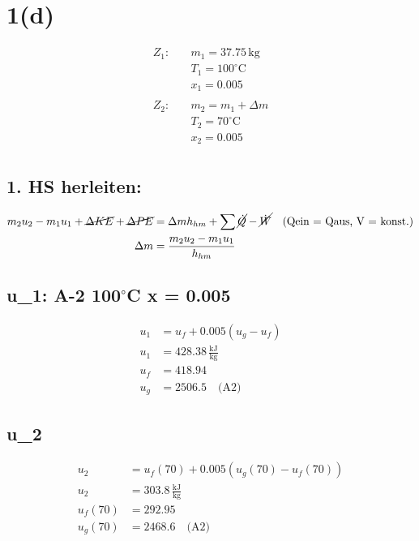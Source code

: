 \section*{1(d)}

\begin{align*}
Z_1: & \quad m_1 = 37.75 \, \text{kg} \\
     & \quad T_1 = 100^\circ \text{C} \\
     & \quad x_1 = 0.005 \\
\\
Z_2: & \quad m_2 = m_1 + \Delta m \\
     & \quad T_2 = 70^\circ \text{C} \\
     & \quad x_2 = 0.005 \\
\end{align*}

\subsection*{1. HS herleiten:}

\begin{align*}
m_2 u_2 - m_1 u_1 + \cancel{\Delta KE} + \cancel{\Delta PE} &= \Delta m h_{hm} + \sum \cancel{\dot{Q}} - \cancel{\dot{W}} \quad \text{(Qein = Qaus, V = konst.)} \\
\Delta m &= \frac{m_2 u_2 - m_1 u_1}{h_{hm}}
\end{align*}

\subsection*{u_1: A-2 100$^\circ$C x = 0.005}

\begin{align*}
u_1 &= u_f + 0.005 \left( u_g - u_f \right) \\
u_1 &= 428.38 \, \frac{\text{kJ}}{\text{kg}} \\
u_f &= 418.94 \\
u_g &= 2506.5 \quad \text{(A2)}
\end{align*}

\subsection*{u_2}

\begin{align*}
u_2 &= u_f (70) + 0.005 \left( u_g (70) - u_f (70) \right) \\
u_2 &= 303.8 \, \frac{\text{kJ}}{\text{kg}} \\
u_f (70) &= 292.95 \\
u_g (70) &= 2468.6 \quad \text{(A2)}
\end{align*}

